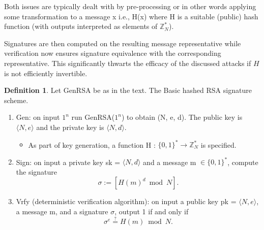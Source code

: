 \documentclass[]{final_report}
\theoremstyle{definition}
\newtheorem{definition}{Definition}[chapter]
\begin{document}
Both issues are typically dealt with by pre-processing or in other words applying some transformation to a message x i.e., H(x) where H is a suitable (public) hash function (with outputs interpreted as elements of $\mathbb{Z}^*_{N}$).

Signatures are then computed on the resulting message representative while verification now ensures signature equivalence with the corresponding representative. This significantly thwarts the efficacy of the discussed attacks if \( H \) is not efficiently invertible.

\begin{definition}
\label{def:hashed rsa}
Let GenRSA be as in the text. The Basic hashed RSA signature scheme.
\begin{mdframed}
\begin{enumerate}
    \item Gen: on input $1^n$ run GenRSA($1^n$) to obtain (N, e, d). The public key is $\langle N, e \rangle$ and the private key is $\langle N, d \rangle$.
    \begin{itemize}
    \item As part of key generation, a function H : $\{0, 1\}^* \rightarrow \mathbb{Z}^*_{N}$ is specified.
    \end{itemize}

    \item Sign: on input a private key sk = $\langle N, d \rangle$ and a message m $\in \{0, 1\}^*$, compute the signature
\[\sigma := [H(m)^d \bmod N].\]
    \item Vrfy (deterministic verification algorithm):  on input a public key pk = $\langle N, e \rangle$, a message m, and a signature $\sigma$, output 1 if and only if
    \[\sigma^e \stackrel{?}{=} H(m) \bmod N.\]
\end{enumerate}
\end{mdframed}

\end{definition}
\end{document}
